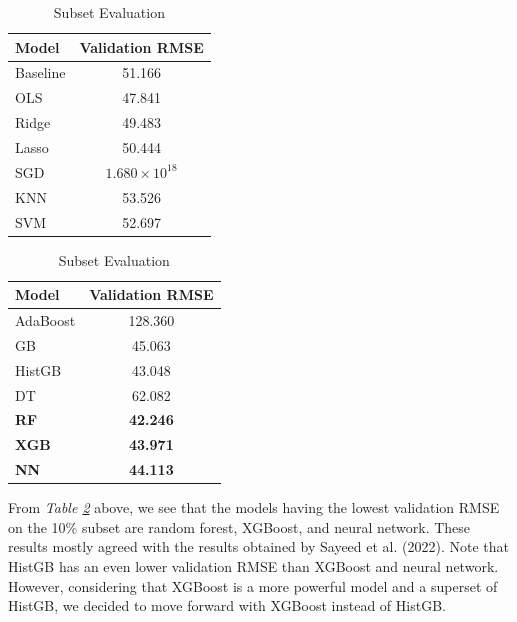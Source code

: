 \documentclass[draft]{agujournal2019}
\begin{document}
\begin{table}[htbp]
    \centering
    \begin{minipage}{0.48\linewidth}
        \centering
        \begin{tabular}{l c}
            \toprule
            \textbf{Model} & \textbf{Validation RMSE} \\
            \midrule
            Baseline & 51.166 \\
            OLS & 47.841 \\
            Ridge & 49.483 \\
            Lasso & 50.444 \\
            SGD & \(1.680\times 10^{18}\) \\
            KNN & 53.526 \\
            SVM & 52.697 \\
            \bottomrule
        \end{tabular}
    \end{minipage}
    \quad
    \begin{minipage}{0.48\linewidth}
        \centering
        \begin{tabular}{l c}
            \toprule
            \textbf{Model} & \textbf{Validation RMSE} \\
            \midrule
            AdaBoost & 128.360 \\
            GB & 45.063 \\
            HistGB & 43.048 \\
            DT & 62.082 \\
            \textbf{RF} & \textbf{42.246} \\
            \textbf{XGB} & \textbf{43.971} \\
            \textbf{NN} & \textbf{44.113} \\
            \bottomrule
        \end{tabular}
    \end{minipage}
    \caption{Subset Evaluation}
    \label{tab:subset_eval}
\end{table}

From \textit{Table \ref{tab:subset_eval}} above, we see that the models having the lowest validation RMSE on the 10\% subset are random forest, XGBoost, and neural network. These results mostly agreed with the results obtained by Sayeed et al. (2022). Note that HistGB has an even lower validation RMSE than XGBoost and neural network. However, considering that XGBoost is a more powerful model and a superset of HistGB, we decided to move forward with XGBoost instead of HistGB.
\end{document}
